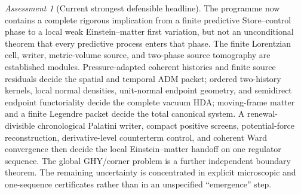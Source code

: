 \documentclass[11pt]{article}
\theoremstyle{definition}
\theoremstyle{remark}
\newtheorem{assessment}[theorem]{Assessment}
\begin{document}
\begin{assessment}[Current strongest defensible headline]
The programme now contains a complete rigorous implication from a finite
predictive Store--control phase to a local weak Einstein--matter first
variation, but not an unconditional theorem that every predictive process
enters that phase.  The finite Lorentzian cell, writer, metric-volume source,
and two-phase source tomography are established modules.  Pressure-adapted
coherent histories and finite source residuals decide the spatial and temporal
ADM packet; ordered two-history kernels, local normal densities, unit-normal
endpoint geometry, and semidirect endpoint functoriality decide the complete
vacuum HDA; moving-frame matter and a finite Legendre packet decide the total
canonical system.  A renewal-divisible chronological Palatini writer,
compact positive screens, potential-force reconstruction, derivative-level
counterterm control, and coherent Ward convergence then decide the local
Einstein--matter handoff on one regulator sequence.  The global GHY/corner
problem is a further independent boundary theorem.  The remaining uncertainty
is concentrated in explicit microscopic and one-sequence certificates rather
than in an unspecified ``emergence'' step.
\end{assessment}
\end{document}
